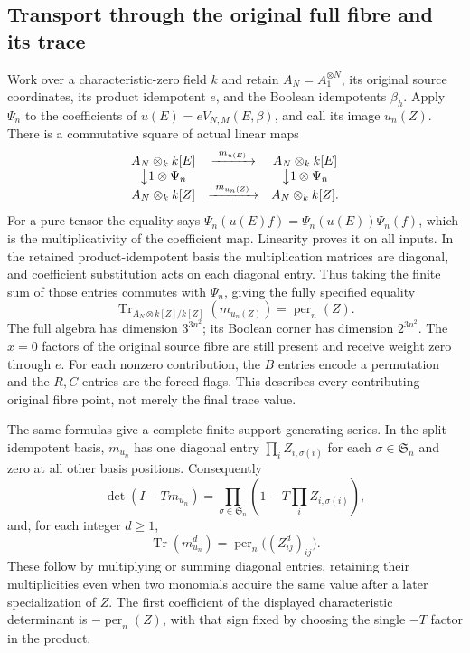 \subsection{Transport through the original full fibre and its trace}

Work over a characteristic-zero field $k$ and retain $A_N=A_1^{\otimes N}$,
its original source coordinates, its product idempotent $e$, and the
Boolean idempotents $\beta_h$. Apply $\Psi_n$ to the coefficients of
$u(E)=eV_{N,M}(E,\beta)$, and call its image $u_n(Z)$.
There is a commutative square of actual linear maps
\[
\begin{array}{ccc}
 A_N\otimes_k k[E]&\xrightarrow{\ m_{u(E)}\ }&A_N\otimes_k k[E]\\
 \big\downarrow{1\otimes\Psi_n}&&\big\downarrow{1\otimes\Psi_n}\\
 A_N\otimes_k k[Z]&\xrightarrow{\ m_{u_n(Z)}\ }&A_N\otimes_k k[Z].
\end{array}
\]
For a pure tensor the equality says
$\Psi_n(u(E)f)=\Psi_n(u(E))\Psi_n(f)$, which is the multiplicativity
of the coefficient map. Linearity proves it on all inputs.
In the retained product-idempotent basis the multiplication matrices
are diagonal, and coefficient substitution acts on each diagonal entry.
Thus taking the finite sum of those entries commutes with $\Psi_n$,
giving the fully specified equality
\begin{equation}\label{eq:per-original-trace}
 \operatorname{Tr}_{A_N\otimes k[Z]/k[Z]}(m_{u_n(Z)})
        =\operatorname{per}_n(Z).
\end{equation}
The full algebra has dimension $3^{3n^2}$; its Boolean corner has
dimension $2^{3n^2}$. The $x=0$ factors of the original source fibre
are still present and receive weight zero through $e$.
For each nonzero contribution, the $B$ entries encode a permutation
and the $R,C$ entries are the forced flags. This describes every
contributing original fibre point, not merely the final trace value.

The same formulas give a complete finite-support generating series.
In the split idempotent basis, $m_{u_n}$ has one diagonal entry
$\prod_i Z_{i,\sigma(i)}$ for each $\sigma\in\mathfrak S_n$ and
zero at all other basis positions. Consequently
\[
 \det(I-Tm_{u_n})=
 \prod_{\sigma\in\mathfrak S_n}
       \left(1-T\prod_i Z_{i,\sigma(i)}\right),
\]
and, for each integer $d\ge1$,
\[
 \operatorname{Tr}(m_{u_n}^{d})
       =\operatorname{per}_n\bigl((Z_{ij}^{d})_{ij}\bigr).
\]
These follow by multiplying or summing diagonal entries, retaining
their multiplicities even when two monomials acquire the same value
after a later specialization of $Z$. The first coefficient of the
displayed characteristic determinant is $-\operatorname{per}_n(Z)$,
with that sign fixed by choosing the single $-T$ factor in the product.


